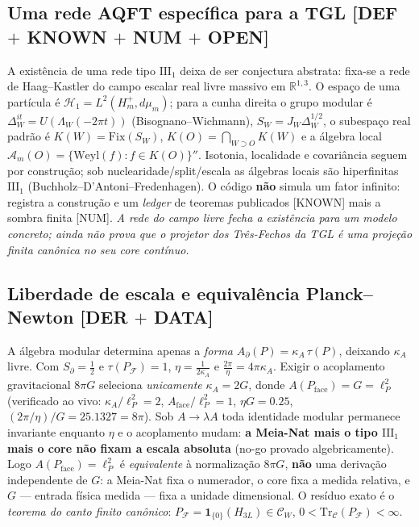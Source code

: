 \documentclass[11pt]{article}
\theoremstyle{definition}\newtheorem{deriv}{Derivação}
\begin{document}
\subsection*{Uma rede AQFT específica para a TGL \textsf{[DEF $+$ KNOWN $+$ NUM $+$ OPEN]}}

A existência de uma rede tipo $\mathrm{III}_1$ deixa de ser conjectura abstrata: fixa-se a rede de Haag--Kastler do campo escalar real livre massivo em $\mathbb R^{1,3}$. O espaço de uma partícula é $\mathcal H_1=L^2(H_m^+,d\mu_m)$; para a cunha direita o grupo modular é $\Delta_W^{it}=U(\Lambda_W(-2\pi t))$ (Bisognano--Wichmann), $S_W=J_W\Delta_W^{1/2}$, o subespaço real padrão é $K(W)=\mathrm{Fix}(S_W)$, $K(O)=\bigcap_{W\supset O}K(W)$ e a álgebra local $\mathcal A_m(O)=\{\mathrm{Weyl}(f):f\in K(O)\}''$. Isotonia, localidade e covariância seguem por construção; sob nuclearidade/split/escala as álgebras locais são hiperfinitas $\mathrm{III}_1$ (Buchholz--D'Antoni--Fredenhagen). O código \textbf{não} simula um fator infinito: registra a construção e um \emph{ledger} de teoremas publicados \textsf{[KNOWN]} mais a sombra finita \textsf{[NUM]}. \emph{A rede do campo livre fecha a existência para um modelo concreto; ainda não prova que o projetor dos Três-Fechos da TGL é uma projeção finita canônica no seu core contínuo.}

\subsection*{Liberdade de escala e equivalência Planck--Newton \textsf{[DER $+$ DATA]}}

A álgebra modular determina apenas a \emph{forma} $A_\partial(P)=\kappa_A\,\tau(P)$, deixando $\kappa_A$ livre. Com $S_\partial=\tfrac12$ e $\tau(P_{\mathcal F})=1$, $\eta=\tfrac{1}{2\kappa_A}$ e $\tfrac{2\pi}{\eta}=4\pi\kappa_A$. Exigir o acoplamento gravitacional $8\pi G$ seleciona \emph{unicamente} $\kappa_A=2G$, donde $A(P_{\mathrm{face}})=G=\ell_P^2$ (verificado ao vivo: $\kappa_A/\ell_P^2=2$, $A_{\mathrm{face}}/\ell_P^2=1$, $\eta G=0.25$, $(2\pi/\eta)/G=25.1327=8\pi$). Sob $A\to\lambda A$ toda identidade modular permanece invariante enquanto $\eta$ e o acoplamento mudam: \textbf{a Meia-Nat mais o tipo $\mathrm{III}_1$ mais o core não fixam a escala absoluta} (no-go provado algebricamente). Logo $A(P_{\mathrm{face}})=\ell_P^2$ é \emph{equivalente} à normalização $8\pi G$, \textbf{não} uma derivação independente de $G$: a Meia-Nat fixa o numerador, o core fixa a medida relativa, e $G$ --- entrada física medida --- fixa a unidade dimensional. O resíduo exato é o \emph{teorema do canto finito canônico}: $P_{\mathcal F}=\mathbf 1_{\{0\}}(H_{3L})\in\mathcal C_W$, $0<\mathrm{Tr}_{\mathcal C}(P_{\mathcal F})<\infty$.
\end{document}
